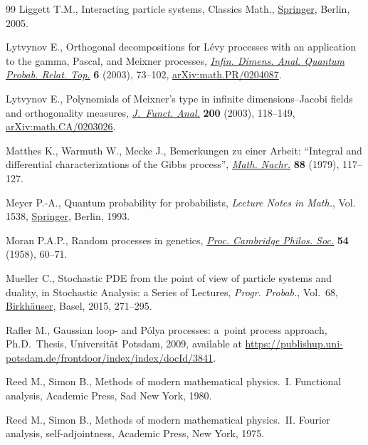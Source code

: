 \begin{thebibliography}{99}
Liggett T.M., Interacting particle systems, Classics Math., \href{https://doi.org/10.1007/b138374}{Springer}, Berlin,
 2005.

Lytvynov E., Orthogonal decompositions for {L}\'evy processes with an
 application to the gamma, {P}ascal, and {M}eixner processes, \href{https://doi.org/10.1142/S0219025703001031}{\textit{Infin.
 Dimens. Anal. Quantum Probab. Relat. Top.}} \textbf{6} (2003), 73--102,
 \href{https://arxiv.org/abs/math.PR/0204087}{arXiv:math.PR/0204087}.

Lytvynov E., Polynomials of {M}eixner's type in infinite dimensions--{J}acobi
 fields and orthogonality measures, \href{https://doi.org/10.1016/S0022-1236(02)00081-2}{\textit{J.~Funct. Anal.}} \textbf{200}
 (2003), 118--149, \href{https://arxiv.org/abs/math.CA/0203026}{arXiv:math.CA/0203026}.

Matthes K., Warmuth W., Mecke J., Bemerkungen zu einer {A}rbeit: ``{I}ntegral
 and differential characterizations of the {G}ibbs process'', \href{https://doi.org/10.1002/mana.19790880110}{\textit{Math.
 Nachr.}} \textbf{88} (1979), 117--127.

Meyer P.-A., Quantum probability for probabilists, \textit{Lecture Notes in
 Math.}, Vol. 1538, \href{https://doi.org/10.1007/978-3-662-21558-6}{Springer}, Berlin, 1993.

Moran P.A.P., Random processes in genetics, \href{https://doi.org/10.1017/s0305004100033193}{\textit{Proc. Cambridge Philos.
 Soc.}} \textbf{54} (1958), 60--71.

Mueller C., Stochastic {PDE} from the point of view of particle systems and
 duality, in Stochastic Analysis: a Series of Lectures, \textit{Progr.
 Probab.}, Vol.~68, \href{https://doi.org/10.1007/978-3-0348-0909-2_10}{Birkh\"auser}, Basel, 2015, 271--295.

Rafler M., Gaussian loop- and {P}\'olya processes: a~point process approach,
 Ph.D.~Thesis, {U}niversit\"at {P}otsdam, 2009, available at
 \url{https://publishup.uni-potsdam.de/frontdoor/index/index/docId/3841}.

Reed M., Simon B., Methods of modern mathematical physics.~{I}. Functional
 analysis, Academic Press, Sad New York, 1980.

Reed M., Simon B., Methods of modern mathematical physics.~{II}. {F}ourier
 analysis, self-adjointness, Academic Press, New York, 1975.


\end{thebibliography}
